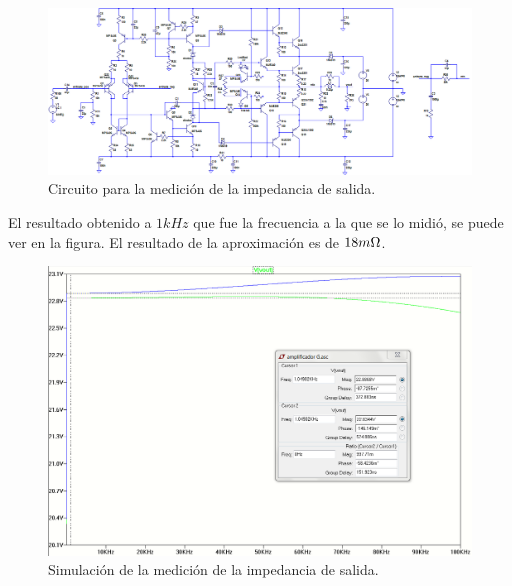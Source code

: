 \begin{figure}[H]
\centering
\includegraphics[width=1\textwidth]{img/Rout_circ_2.png}
\caption{Circuito para la medición de la impedancia de salida.}
\label{Rout_med_circ}
\end{figure}

El resultado obtenido a $1kHz$ que fue la frecuencia a la que se lo midió, se puede ver en la figura. El resultado de la aproximación es de $18m\ohm$.

\begin{figure}[H]
\centering
\includegraphics[width=1\textwidth]{img/Rout_2.png}
\caption{Simulación de la medición de la impedancia de salida.}
\label{Rout_med}
\end{figure}